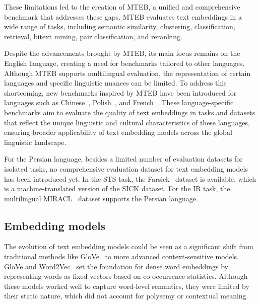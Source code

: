 These limitations led to the creation of MTEB, a unified and comprehensive benchmark that addresses these gaps. MTEB evaluates text embeddings in a wide range of tasks, including semantic similarity, clustering, classification, retrieval, bitext mining, pair classification, and reranking.

Despite the advancements brought by MTEB, its main focus remains on the English language, creating a need for benchmarks tailored to other languages. Although MTEB supports multilingual evaluation, the representation of certain languages and specific linguistic nuances can be limited. To address this shortcoming, new benchmarks inspired by MTEB have been introduced for languages such as Chinese~\citep{10.1145/3626772.3657878}, Polish~\citep{poswiata2024pl}, and French~\citep{ciancone2024mteb}. These language-specific benchmarks aim to evaluate the quality of text embeddings in tasks and datasets that reflect the unique linguistic and cultural characteristics of these languages, ensuring broader applicability of text embedding models across the global linguistic landscape.

For the Persian language, besides a limited number of evaluation datasets for isolated tasks, no comprehensive evaluation dataset for text embedding models has been introduced yet. %
In the STS task, the Farsick~\citep{9721521} dataset is available, which is a machine-translated version of the SICK dataset. %
For the IR task, the multilingual MIRACL~\citep{zhang-etal-2023-miracl} dataset  supports the Persian language. %

\subsection{Embedding models}
The evolution of text embedding models could be seen as a significant shift from traditional methods like GloVe~\citep{pennington-etal-2014-glove} to more advanced context-sensitive models. GloVe and Word2Vec~\citep{10.5555/2999792.2999959} set the foundation for dense word embeddings by representing words as fixed vectors based on co-occurrence statistics. Although these models worked well to capture word-level semantics, they were limited by their static nature, which did not account for polysemy or contextual meaning.

